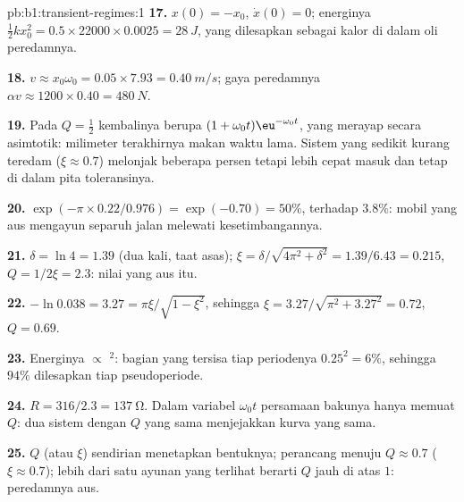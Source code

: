 \begin{solution}{pb:b1:transient-regimes:1}
\textbf{17.} $x(0) = -x_0$, $\dot x(0) = 0$; energinya $\tfrac12 kx_0^2 =
0.5 \times 22000 \times 0.0025 = \qty{28}{J}$, yang dilesapkan sebagai
kalor di dalam oli peredamnya.

\textbf{18.} $v \approx x_0\omega_0 = 0.05 \times 7.93 = \qty{0.40}{m/s}$;
gaya peredamnya $\alpha v \approx 1200 \times 0.40 = \qty{480}{N}$.

\textbf{19.} Pada $Q = \tfrac12$ kembalinya berupa $(1 + \omega_0 t)\eu^{-\omega_0
t}$, yang merayap secara asimtotik: milimeter terakhirnya makan waktu
lama. Sistem yang sedikit kurang teredam ($\xi \approx 0.7$) melonjak
beberapa persen tetapi lebih cepat masuk dan tetap di dalam pita toleransinya.

\textbf{20.} $\exp(-\pi \times 0.22/0.976) = \exp(-0.70) = 50\%$, terhadap
$3.8\%$: mobil yang aus mengayun separuh jalan melewati kesetimbangannya.

\textbf{21.} $\delta = \ln 4 = 1.39$ (dua kali, taat asas); $\xi =
\delta/\sqrt{4\pi^2 + \delta^2} = 1.39/6.43 = 0.215$, $Q = 1/2\xi = 2.3$:
nilai yang aus itu.

\textbf{22.} $-\ln 0.038 = 3.27 = \pi\xi/\sqrt{1 - \xi^2}$, sehingga $\xi =
3.27/\sqrt{\pi^2 + 3.27^2} = 0.72$, $Q = 0.69$.

\textbf{23.} Energinya $\propto$ $^2$: bagian yang tersisa tiap
periodenya $0.25^2 = 6\%$, sehingga $94\%$ dilesapkan tiap pseudoperiode.

\textbf{24.} $R = 316/2.3 = \qty{137}{\ohm}$. Dalam variabel $\omega_0 t$
persamaan bakunya hanya memuat $Q$: dua sistem dengan $Q$ yang sama
menjejakkan kurva yang sama.

\textbf{25.}  $Q$ (atau $\xi$) sendirian menetapkan
bentuknya; perancang menuju $Q \approx 0.7$ ($\xi \approx 0.7$); lebih
dari satu ayunan yang terlihat berarti $Q$ jauh di atas $1$: peredamnya aus.
\end{solution}
